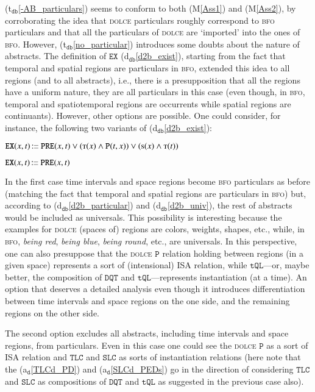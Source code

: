 \documentclass[ao]{iosart2x}
\newcommand{\nb}[1]{\textcolor{red}{$|$}\marginpar{\hspace*{-0cm}\parbox{20mm}{\scriptsize\raggedright\textcolor{red}{#1}}}}
\newcommand{\bflist}{\begin{list}{}{\setlength{\topsep}{2mm}\setlength{\parsep}{0mm}\setlength{\leftmargin}{9.2mm}\setlength{\labelwidth}{8mm}}}
\newcommand{\eflist}{\end{list}}
\newcommand{\dolceAxLabel}{\textrm{a$_\texttt{d}$}}
\newcommand{\dbDefLabel}{\textrm{d$_\texttt{db}$}}
\newcommand{\dbThrLabel}{\textrm{t$_\texttt{db}$}}
\newcommand{\refdolceax}[1]{({\dolceAxLabel}\ref{#1})}
\newcommand{\refdbdf}[1]{({\dbDefLabel}\ref{#1})}
\newcommand{\refdbth}[1]{({\dbThrLabel}\ref{#1})}
\newcommand{\pr}[1]{\mathtt{#1}}
\newcommand\textequal{%
 \rule[.08ex]{5pt}{0.35pt}\llap{\rule[.78ex]{5pt}{0.35pt}}}
\newcommand{\sdef}{{\hspace{1.5pt}:\hspace{-2.5pt}\textequal\hspace{3pt}}}
\newcommand{\dolce}{{\textsc{dolce}}}
\newcommand{\bfo}{{\textsc{bfo}}}
\newcommand {\Sdcat} {\textsc{s}}
\newcommand {\Tdcat} {\textsc{t}}
\newcommand {\Pd} {\ensuremath{\pr{P}}}
\newcommand {\PREd} {\ensuremath{\pr{PRE}}}
\newcommand {\DQTd} {\ensuremath{\pr{DQT}}}
\newcommand {\TQLd} {\ensuremath{\pr{tQL}}}
\newcommand {\SLCd} {\ensuremath{\pr{SLC}}}
\newcommand {\TLCd} {\ensuremath{\pr{TLC}}}
\newcommand{\bfoexist}{\pr{EX}}
\begin{document}
\refdbth{-AB_particulars} seems to conform to both (M\ref{Ass1}) and (M\ref{Ass2}), by corroborating the idea that {\dolce} particulars roughly correspond to {\bfo} particulars and that all the particulars of {\dolce} are `imported' into the ones of {\bfo}. However, \refdbth{no_particular} introduces some doubts about the nature of abstracts. The definition of $\bfoexist$ \refdbdf{d2b_exist}, starting from the fact that temporal and spatial regions are particulars in {\bfo}, extended this idea to all regions (and to all abstracts), i.e., there is a presupposition that all the regions have a uniform nature, they are all particulars in this case (even though, in {\bfo}, temporal and spatiotemporal regions are occurrents while spatial regions are continuants). However, other options are possible. One could consider, for instance, the following two variants of \refdbdf{d2b_exist}:
\bflist
\item[] $\bfoexist(x,t)\sdef \PREd(x,t) \lor (\Tdcat(x) \land \Pd(t,x)) \lor (\Sdcat(x) \land \Tdcat(t))$
\item[] $\bfoexist(x,t)\sdef \PREd(x,t)$
\eflist
%
In the first case time intervals and space regions become {\bfo} particulars as before (matching the fact that temporal and spatial regions are particulars in {\bfo}) but, according to \refdbdf{d2b_particular} and \refdbdf{d2b_univ}, the rest of abstracts would be included as universals. This possibility is interesting because the examples for {\dolce} (spaces of) regions are colors, weights, shapes, etc., while, in {\bfo}, \emph{being red}, \emph{being blue}, \emph{being round}, etc., are universals. In this perspective, one can also presuppose that the {\dolce} $\Pd$ relation holding between regions (in a given space) represents a sort of (intensional) ISA relation, while $\TQLd$---or, maybe better, the composition of $\DQTd$ and  $\TQLd$---represents instantiation (at a time). An option that deserves a detailed analysis even though it introduces differentiation between time intervals and space regions on the one side, and the remaining regions on the other side.%

The second option excludes all abstracts, including time intervals and space regions, from particulars. Even in this case one could see the {\dolce} $\Pd$ as a sort of ISA relation and $\TLCd$ and $\SLCd$ as sorts of instantiation relations (here note that the \refdolceax{TLCd_PD} and  \refdolceax{SLCd_PEDs} go in the direction of considering $\TLCd$ and $\SLCd$ as compositions of $\DQTd$ and  $\TQLd$ as suggested in the previous case also).
\end{document}
